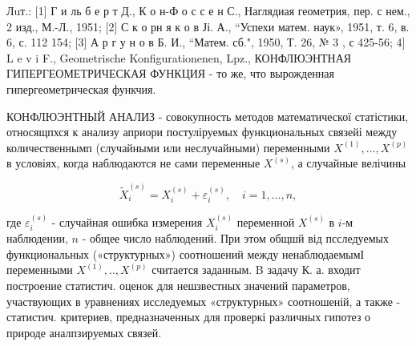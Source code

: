 \documentclass[10pt]{article}
\begin{document}
Лuт.: [1] Г и ль б е р т Д., К о н-Ф о с с е н С., Наглядиая геометрия, пер. с нем., 2 изд., М.-Л., 1951; [2] С к о рн я к о в Јі. А., “Успехи матем. наук», 1951, т. 6, в. 6, с. 112 154; [3] А р г у н о в Б. И., “Матем. сб.", 1950, Т. 26, № 3 , с 425-56; 4] L e v i F., Geometrische Konfigurationenen, Lpz., КОНФЛЮЭНТНАЯ ГИПЕРГЕОМЕТРИЧЕСКАЯ ФУНКЦИЯ - то же, что вырожденная гипергеометрическая функчия.



КОНФЛЮЭНТНЫЙ АНАЛИЗ - совокупность методов математическої статістики, относящпхся к анализу априори постуліруемых функциональных связейі между количественнымп (случайными или неслучайными) переменными $X^{(1)}, \ldots, X^{(p)}$ в условіях, когда наблюдаются не сами переменные $X^{(s)}$, а случайные велічины



\[

\tilde{X}_{i}^{(s)}=X_{i}^{(s)}+\varepsilon_{i}^{(s)}, \quad i=1, \ldots, n,

\]



где $\varepsilon_{i}^{(s)}$ - случайная ошибка измерения $X_{i}^{(s)}$ переменной $X^{(s)}$ в $i$-м наблюдении, $n$ - общее число наблюдений. При этом общшй від псследуемых функциональных («структурных») соотношений между ненаблюдаемымІ переменными $X^{(1)}, . ., X^{(p)}$ считается заданным. B задачу К. а. входит построение статистич. оценок для нешзвестных значений параметров, участвующих в уравнениях исследуемых «структурных» соотношеній, а также - статистич. критериев, предназначенных для проверкі различных гипотез о природе аналпзируемых связей.
\end{document}
